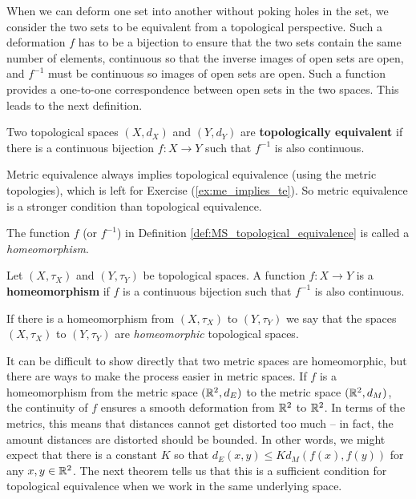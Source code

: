 \label{sec_top_equiv}
 
When we can deform one set into another without poking holes in the set, we consider the two sets to be equivalent from a topological perspective. Such a deformation $f$ has to be a bijection to ensure that the two sets contain the same number of elements, continuous so that the inverse images of open sets are open, and $f^{-1}$ must be continuous so images of open sets are open. Such a function provides a one-to-one correspondence between open sets in the two spaces. This leads to the next definition.

\begin{definition} \label{def:MS_topological_equivalence} Two topological spaces $(X,d_X)$ and $(Y,d_Y)$ are \textbf{topologically equivalent} if there is a continuous bijection $f : X \to Y$ such that $f^{-1}$ is also continuous.  
\end{definition}

Metric equivalence always implies topological equivalence (using the metric topologies), which is left for Exercise (\ref{ex:me_implies_te}). So metric equivalence is a stronger condition than topological equivalence.

The function $f$ (or $f^{-1}$) in Definition \ref{def:MS_topological_equivalence} is called a \emph{homeomorphism}.

\begin{definition} \label{def:Homeomorphism} Let $(X,\tau_X)$ and $(Y,\tau_Y)$ be topological spaces. A function $f: X \to Y$ is a \textbf{homeomorphism} if $f$ is a continuous bijection such that $f^{-1}$ is also continuous.  
\end{definition}

If there is a homeomorphism from $(X,\tau_X)$ to $(Y,\tau_Y)$ we say that the spaces $(X,\tau_X)$ to $(Y,\tau_Y)$ are \emph{homeomorphic} topological spaces. 

It can be difficult to show directly that two metric spaces are homeomorphic, but there are ways to make the process easier in metric spaces. If $f$ is a homeomorphism from the metric space $(\mathbb{R}^2, d_E)$ to the metric space $(\mathbb{R}^2, d_M)$, the continuity of $f$ ensures a smooth deformation from $\mathbb{R}^2$ to $\mathbb{R}^2$. In terms of the metrics, this means that distances cannot get distorted too much -- in fact, the amount distances are distorted should be bounded. In other words, we might expect that there is a constant $K$ so that $d_E(x,y) \leq K d_M(f(x), f(y))$ for any $x, y \in \mathbb{R}^2$. The next theorem tells us that this is a sufficient condition for topological equivalence when we work in the same underlying space. 

